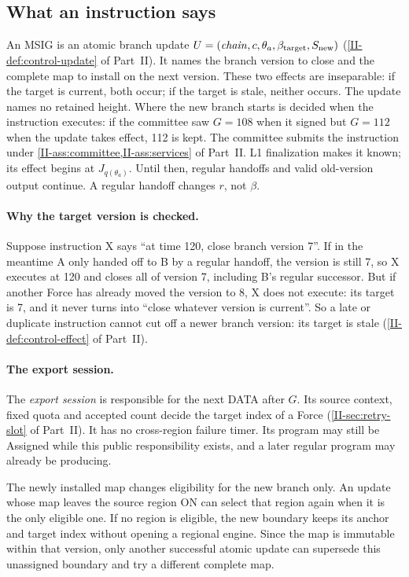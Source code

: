 \documentclass[11pt,a4paper]{article}
\newcommand{\defterm}[1]{\textcolor{rrBlue}{\textit{#1}}}
\begin{document}
\subsection{What an instruction says}
\label{sec:force-stages}
An MSIG is an atomic branch update
$U=(\mathit{chain},c,\theta_a,\beta_{\rm target},S_{\rm new})$
(\cref{II-def:control-update} of Part~II). It names the branch version to close and the
complete map to install on the next version. These two effects are
inseparable: if the target is current, both occur; if the target is
stale, neither occurs. The update names no retained height. Where the new
branch starts is decided when the instruction executes: if the committee
saw $G=108$ when it signed but $G=112$ when the update takes effect, 112
is kept. The committee submits the instruction under
\cref{II-ass:committee,II-ass:services} of Part~II. L1 finalization makes it known; its
effect begins at $J_{q(\theta_a)}$. Until then, regular handoffs and
valid old-version output continue. A regular handoff changes $r$, not
$\beta$.

\paragraph{Why the target version is checked.}
Suppose instruction X says ``at time 120, close branch version 7''. If
in the meantime A only handed off to B by a regular handoff, the version
is still 7, so X executes at 120 and closes all of version 7, including
B's regular successor. But if another Force has already moved the
version to 8, X does not execute: its target is 7, and it never turns
into ``close whatever version is current''. So a late or duplicate
instruction cannot cut off a newer branch version: its target is stale
(\cref{II-def:control-effect} of Part~II).

\paragraph{The export session.}
The \defterm{export session} is responsible for the next DATA after $G$.
Its source context, fixed quota and accepted count decide the target
index of a Force (\cref{II-sec:retry-slot} of Part~II). It has no cross-region failure
timer. Its program may still be Assigned while this public responsibility
exists, and a later regular program may already be producing.

The newly installed map changes eligibility for the new branch only. An
update whose map leaves the source region ON can select that region again
when it is the only eligible one. If no region is eligible, the new
boundary keeps its anchor and target index without opening a regional
engine. Since the map is immutable within that version, only another
successful atomic update can supersede this unassigned boundary and try
a different complete map.
\end{document}
